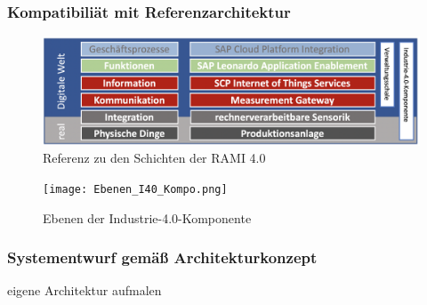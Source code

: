 \subsubsection{Kompatibiliät mit Referenzarchitektur}

\begin{figure}[H]
  \centering
  \includegraphics[width=1.0\linewidth]{pictures/rami_custom1}
  \caption[Referenz zu den Schichten der RAMI 4.0]{Referenz zu den Schichten der RAMI 4.0}
  \label{ramicustom}
\end{figure}

\begin{figure}[h]
  \centering
  \texttt{[image: Ebenen\_I40\_Kompo.png]}
  \caption[Ebenen der Industrie-4.0-Komponente]{Ebenen der Industrie-4.0-Komponente \citep[S. 52]{BITKOM2015}}
  \label{ebenen_i40}
\end{figure}

\subsubsection{Systementwurf gemäß Architekturkonzept}

eigene Architektur aufmalen

